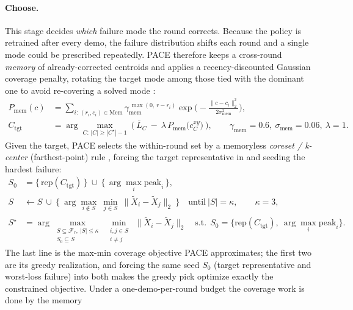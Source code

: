 \documentclass[letterpaper]{article} %
\begin{document}
\paragraph{Choose.}
This stage decides \emph{which} failure mode the round corrects. Because the policy
is retrained after every demo, the failure distribution shifts each round and a
single mode could be prescribed repeatedly. PACE therefore keeps a cross-round
\emph{memory} of already-corrected centroids and applies a recency-discounted
Gaussian coverage penalty, rotating the target mode among those tied with the
dominant one to avoid re-covering a solved mode
\cite{florensa2017reversecurriculum,eysenbach2018leavenotrace}:
\begin{align}
P_{\mathrm{mem}}(c)&=\sum_{i:\,(r_i,c_i)\in\mathrm{Mem}}\gamma_{\mathrm{mem}}^{\,\max(0,\,r-r_i)}\exp\!\Big(-\tfrac{\|c-c_i\|_2^2}{2\sigma_{\mathrm{mem}}^2}\Big),\nonumber\\
C_{\mathrm{tgt}}&=\arg\max_{C:\,|C|\ge|C^\star|-1}\ \Big(\ \bar L_{C}\ -\ \lambda\,P_{\mathrm{mem}}\big(c^{xy}_{C}\big)\ \Big),\qquad \gamma_{\mathrm{mem}}=0.6,\ \sigma_{\mathrm{mem}}=0.06,\ \lambda=1.
\label{eq:memory}
\end{align}
Given the target, PACE selects the within-round set by a memoryless \emph{coreset /
k-center} (farthest-point) rule
\cite{sener2018coreset,eldar1997fps,ash2020badge,settles2009active}, forcing the
target representative in and seeding the hardest failure:
\begin{align}
S_0&=\big\{\,\mathrm{rep}(C_{\mathrm{tgt}})\,\big\}\ \cup\ \big\{\,\arg\max_i \mathrm{peak}_i\,\big\}, \nonumber\\
S&\leftarrow S\ \cup\ \Big\{\ \arg\max_{i\notin S}\ \min_{j\in S}\ \big\|\tilde X_i-\tilde X_j\big\|_2\ \Big\}\quad\text{until}\ |S|=\kappa,\qquad \kappa=3, \nonumber\\
S^\star&=\arg\max_{\substack{S\subseteq\mathcal{F}_r,\ |S|\le\kappa\\ S_0\subseteq S}}\ \min_{\substack{i,j\in S\\ i\ne j}}\ \big\|\tilde X_i-\tilde X_j\big\|_2
\quad\text{s.t.}\ \ S_0=\big\{\mathrm{rep}(C_{\mathrm{tgt}}),\ \arg\max_i\mathrm{peak}_i\big\}.
\label{eq:diversity}
\end{align}
The last line is the max-min coverage objective PACE approximates; the first two are
its greedy realization, and forcing the same seed $S_0$ (target representative and
worst-loss failure) into both makes the greedy pick optimize exactly the constrained
objective. Under a one-demo-per-round budget the coverage work is done by the memory
\end{document}
